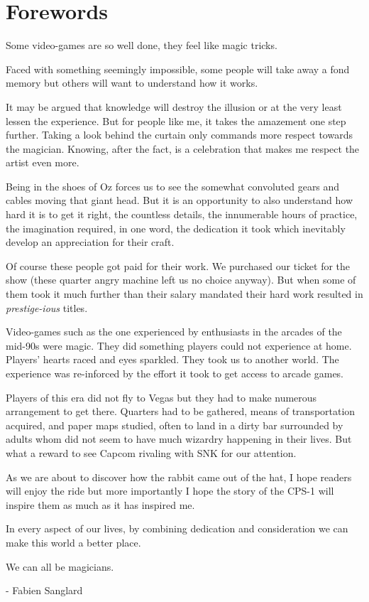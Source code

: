 \chapter{Forewords}

Some video-games are so well done, they feel like magic tricks.

Faced with something seemingly impossible, some people will take away a fond memory but others will want to understand
how it works.

It may be argued that knowledge will destroy the illusion or at the very least lessen the experience. But for people like me, it takes the amazement one step further. Taking a look behind the curtain only commands more respect towards the magician. Knowing, after the fact, is a celebration that makes me respect the artist even more.

Being in the shoes of Oz forces us to see the somewhat convoluted gears and cables moving that giant head. But it is an opportunity to also understand how hard it is to get it right, the countless details, the innumerable hours of practice, the imagination required, in one word, the dedication it took which inevitably develop an appreciation for their craft.


Of course these people got paid for their work. We purchased our ticket for the show (these quarter angry machine left us no choice anyway). But when some of them took it much further than their salary mandated their hard work resulted in \emph{prestige-ious} titles.

Video-games such as the one experienced by enthusiasts in the arcades of the mid-90s were magic. They did something players could not experience at home. Players' hearts raced and eyes sparkled. They took us to another world. The experience was re-inforced by the effort it took to get access to arcade games. 

Players of this era did not fly to Vegas but they had to make numerous arrangement to get there. Quarters had to be gathered,  means of transportation acquired, and paper maps studied, often to land in a dirty bar surrounded by adults whom did not seem to have much wizardry happening in their lives. But what a reward to see Capcom rivaling with SNK for our attention. 

As we are about to discover how the rabbit came out of the hat, I hope readers will enjoy the ride but more importantly I hope the story of the CPS-1 will inspire them as much as it has inspired me.

In every aspect of our lives, by combining dedication and consideration we can make this world a better place. 

We can all be magicians.

- Fabien Sanglard